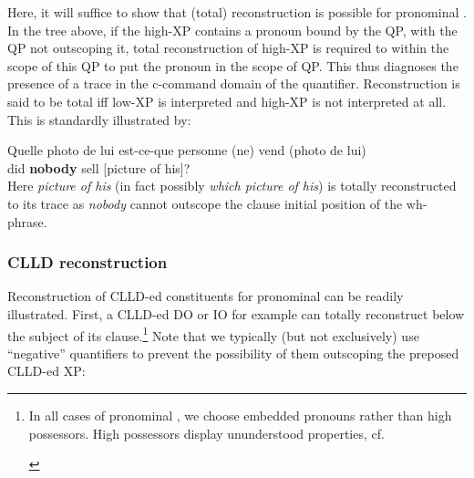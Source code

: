 \documentclass[output=paper]{langsci/langscibook}
\begin{document}
\ea
\z
%
Here, it will suffice to show that (total) reconstruction is possible for
pronominal . In the tree above, if the high-XP contains a pronoun bound
by the QP, with the QP not outscoping it, total reconstruction of high-XP is
required to within the scope of this QP to put the pronoun in the scope of QP.
This thus diagnoses the presence of a trace in the c-command domain of the
quantifier. Reconstruction is said to be total iff low-XP is interpreted and
high-XP is not interpreted at all.  This is standardly illustrated by:

\ea
    \gll Quelle {photo de lui} est-ce-que personne (ne) vend (photo de lui)\\
        [Which \sout{picture of his}\tss{\emph{k}}] did {\bf
        nobody} \hphantom{(}\Neg{} sell [picture of his]?\\
\z
%
Here {\it picture of his} (in fact possibly {\it which picture of his}) is
totally reconstructed to its trace as {\it nobody} cannot outscope the clause
initial position of the wh-phrase.

\subsubsection{CLLD reconstruction}

Reconstruction of \gls{CLLD}-ed constituents for pronominal  can be
readily illustrated. First, a \gls{CLLD}-ed DO or IO for example can totally
reconstruct below the subject of its clause.\footnote{In all cases of
    pronominal , we choose embedded pronouns rather than high
    possessors. High possessors display ununderstood properties, cf.\

\begin{exe}
    \begin{xlist}
    \end{xlist}
\end{exe}}
%
Note that we typically (but not exclusively) use \enquote{negative} quantifiers
to prevent the possibility of them outscoping the preposed \gls{CLLD}-ed XP:
\end{document}

